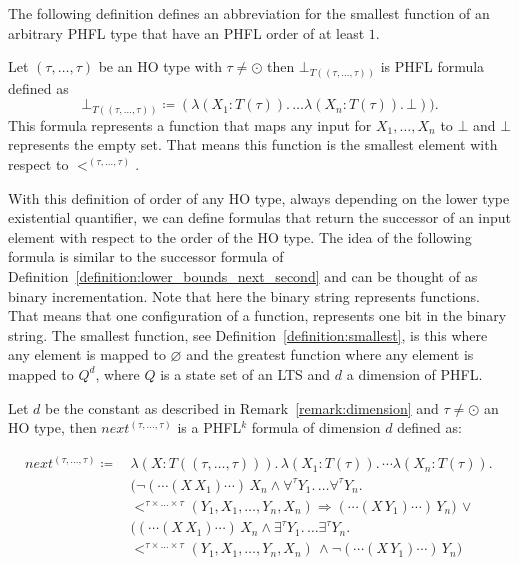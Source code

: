 The following definition defines an abbreviation for the smallest function of an arbitrary PHFL type that have an PHFL order of at least $1$.

\begin{definition} 
\label{definition:smallest}
	Let $(\tau, \dots, \tau)$ be an HO type with $\tau \neq \odot$ then $\bot_{T((\tau, \dots, \tau))}$ is PHFL formula defined as
	\[\bot_{T((\tau, \dots, \tau))} \coloneqq (\lambda (X_1 \colon T(\tau)).\, \dots \lambda (X_n \colon T(\tau)).\,\bot)).\] 
    This formula represents a function that maps any input for $X_1, \dots, X_n$ to $\bot$ and $\bot$ 
    represents the empty set. That means this function is the smallest element with respect to $<^{(\tau, \dots, \tau)}$.
\end{definition}

With this definition of order of any HO type, always depending on the lower type existential quantifier, we can define
formulas that return the successor of an input element with respect to the order of the HO type. The idea of the
following formula is similar to the successor formula of Definition~\ref{definition:lower_bounds_next_second} and can be thought of as binary incrementation. Note that here the binary string represents functions. That means that one configuration of a function, represents one bit in the binary string. The smallest function, see Definition~\ref{definition:smallest}, is this where any element is mapped to $\varnothing$ and the greatest function where any element is mapped to $Q^d$, where $Q$ is a state set of an LTS and $d$ a dimension of PHFL. 

\begin{definition}
    \label{definition:lower_bounds_next_higher}
    Let $d$ be the constant as described in Remark~\ref{remark:dimension} and $\tau \neq \odot$ an
    HO type, then $next^{(\tau, \dots, \tau)}$ is a PHFL$^k$ formula of dimension $d$ defined as:

    \begin{align*}
        next^{(\tau, \dots, \tau)} \coloneqq &\,\lambda (X \colon T ((\tau, \dots, \tau))).\,\lambda (X_1 \colon T(\tau)).\, \dotsb \lambda (X_n \colon T(\tau)).\, \\&\,
        \big(\neg (\dotsb(X\,X_1)\dotsb)\,X_n \wedge \forall^{\tau}Y_1.\, \dots \forall^{\tau}Y_n.\,\\&\,<^{\tau \times
        \dots \times \tau}(Y_1, X_1, \dots, Y_n, X_n) \Rightarrow  (\dotsb(X\,Y_1)\dotsb)\,Y_n\big) \,\vee
        \\&\,\big((\dotsb (X\,X_1) \dotsb)\,X_n \wedge \exists^{\tau}Y_1.\, \dots \exists^{\tau}Y_n.\, \\&\,
        <^{\tau \times \dots \times \tau}
        (Y_1, X_1, \dots, Y_n, X_n)\,\wedge \neg (\dotsb(X\,Y_1)\dotsb)\,Y_n\big)
    \end{align*}
\end{definition}


